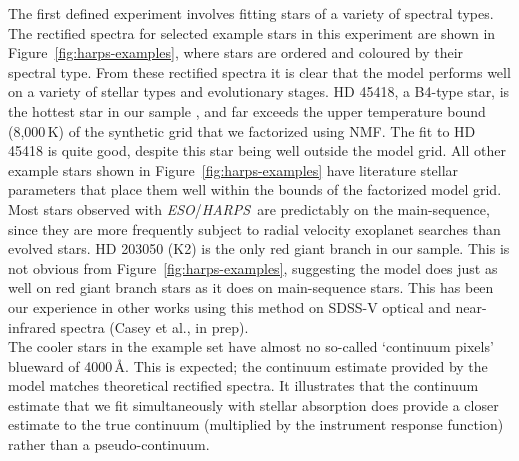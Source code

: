 \documentclass[modern]{aastex631}
\newcommand{\project}[1]{\textit{#1}}
\newcommand{\eso}{\project{ESO}}
\newcommand{\harps}{\project{HARPS}}
\begin{document}
The first defined experiment involves fitting stars of a variety of spectral types. The rectified spectra for selected example stars in this experiment are shown in Figure~\ref{fig:harps-examples}, where stars are ordered and coloured by their spectral type. From these rectified spectra it is clear that the model performs well on a variety of stellar types and evolutionary stages. HD 45418, a B4-type star, is the hottest star in our sample  \citep[$T_\mathrm{eff} = 16750\,K$ according to ][]{2015MNRAS.454...28M}, and far exceeds the upper temperature bound (8,000\,K) of the synthetic grid that we factorized using NMF. The fit to HD 45418 is quite good, despite this star being well outside the model grid. All other example stars shown in Figure~\ref{fig:harps-examples} have literature stellar parameters that place them well within the bounds of the factorized model grid. Most stars observed with \eso/\harps\ are predictably on the main-sequence, since they are more frequently subject to radial velocity exoplanet searches than evolved stars. HD 203050 (K2) is the only red giant branch in our sample. This is not obvious from Figure~\ref{fig:harps-examples}, suggesting the model does just as well on red giant branch stars as it does on main-sequence stars. This has been our experience in other works using this method on SDSS-V optical and near-infrared spectra (Casey et al., in prep).\\


The cooler stars in the example set have almost no so-called `continuum pixels' blueward of 4000\,\AA. This is expected; the continuum estimate provided by the model matches theoretical rectified spectra. It illustrates that the continuum estimate that we fit simultaneously with stellar absorption does provide a closer estimate to the true continuum (multiplied by the instrument response function) rather than a pseudo-continuum.\\
\end{document}
